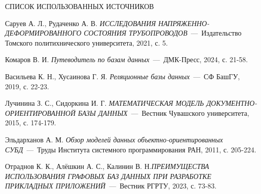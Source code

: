 \begin{center}
    \MakeUppercase{\large Список использованных источников}
\end{center}

\renewcommand{\refname}{} %
\vspace{-11mm}

\makeatletter
\renewcommand\@biblabel[1]{#1.}
\makeatother

\begin{thebibliography}{9}

     Саруев А. Л., Рудаченко А. В. \textit{ИССЛЕДОВАНИЯ НАПРЯЖЕННО-ДЕФОРМИРОВАННОГО СОСТОЯНИЯ ТРУБОПРОВОДОВ}~---~Издательство Томского политихнического университета, 2021, с. 5.
    
     Комаров В. И. \textit{Путеводитель по базам данных}~---~ДМК-Пресс, 2024, с. 21-58.
    
     Васильева К. Н., Хусаинова Г. Я. \textit{Реляционные базы данных}~---~СФ БашГУ, 2019, с. 22-23.
    
     Лучинина З. С., Сидоркина И. Г. \textit{МАТЕМАТИЧЕСКАЯ МОДЕЛЬ ДОКУМЕНТНО-ОРИЕНТИРОВАННОЙ БАЗЫ ДАННЫХ}~---~Вестник Чувашского университета, 2015, с. 174-179.
    
     Эльдарханов А. М. \textit{Обзор моделей данных объектно-ориентированных СУБД}~---~Труды Института системного программирования РАН, 2011, с. 205-224.
    
     Отраднов К. К., Алёшкин А. С., Калинин В. Н.\textit{ПРЕИМУЩЕСТВА ИСПОЛЬЗОВАНИЯ ГРАФОВЫХ БАЗ ДАННЫХ ПРИ РАЗРАБОТКЕ ПРИКЛАДНЫХ ПРИЛОЖЕНИЙ}~---~Вестник РГРТУ, 2023, с. 73-83.
    
\end{thebibliography}
